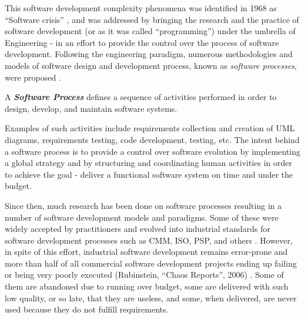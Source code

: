 This software development complexity phenomena was identified in 1968 as ``Software crisis'' 
\cite{naur_crisis_68}, and was addressed by bringing the research and the practice of software development 
(or as it was called ``programming'') under the umbrella of Engineering - in an effort to provide 
the control over the process of software development. 
Following the engineering paradigm, numerous methodologies and models of software design and development 
process, known as \textit{software processes}, were proposed \cite{citeulike:10002165}.

\begin{defn}\label{def_process}
A \textbf{\textit{Software Process}} defines a sequence of activities performed in order 
to design, develop, and maintain software systems.
\end{defn}
Examples of such activities include requirements collection and creation of UML diagrams, 
requirements testing, code development,  testing, etc. The intent behind a software process is 
to provide a control over software evolution by implementing a global strategy and by structuring
and coordinating human activities in order to achieve the goal - deliver a functional software system 
on time and under the budget. 

Since then, much research has been done on software processes resulting in a number
of software development models and paradigms. Some of these were widely accepted by practitioners 
and evolved into industrial standards for software development processes such as CMM, ISO, PSP, 
and others \cite{citeulike:5043104}. However, in spite of this effort, industrial software 
development remains error-prone and more than half of all 
commercial software development projects ending up failing or being very poorly executed 
(Rubinstein, ``Chaos Reports'', 2006) \cite{chaos2006}. Some of them are abandoned due to running 
over budget, some are delivered with such low quality, or so late, that they are useless, and some, 
when delivered, are never used because they do not fulfill requirements. 

